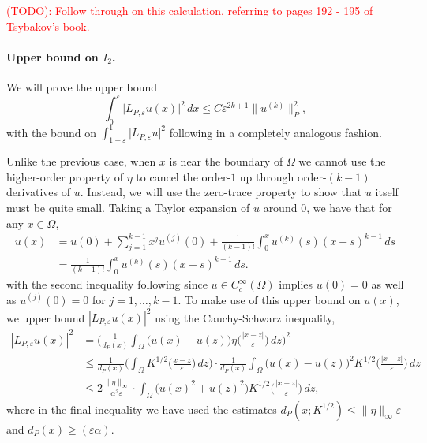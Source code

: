 \documentclass{article}
\newcommand{\1}{\mathbf{1}}
\theoremstyle{definition}
\theoremstyle{remark}
\begin{document}
\textcolor{red}{(TODO): Follow through on this calculation, referring to pages 192 - 195 of Tsybakov's book.}

\paragraph{Upper bound on $I_2$.}
We will prove the upper bound
\begin{equation}
\label{pf:kernel_smoothing_bias_1d_2}
\int_{0}^{\varepsilon} \bigl|L_{P,\varepsilon}u(x)\bigr|^2 \,dx \leq C \varepsilon^{2k + 1}\|u^{(k)}\|_P^2,
\end{equation}
with the bound on $\int_{1 - \varepsilon}^{1} \bigl|L_{P,\varepsilon}u\bigr|^2$ following in a completely analogous fashion.

Unlike the previous case, when $x$ is near the boundary of $\Omega$ we cannot use the higher-order property of $\eta$ to cancel the order-$1$ up through order-$(k - 1)$ derivatives of $u$. Instead, we will use the zero-trace property to show that $u$ itself must be quite small. Taking a Taylor expansion of $u$ around $0$, we have that for any $x \in \Omega$,
\begin{align}
u(x) & = u(0) + \sum_{j = 1}^{k - 1} x^j u^{(j)}(0) + \frac{1}{(k - 1)!} \int_{0}^{x}u^{(k)}(s)(x - s)^{k - 1}\,ds \nonumber \\
& = \frac{1}{(k - 1)!} \int_{0}^{x}u^{(k)}(s)(x - s)^{k - 1}\,ds. \label{pf:kernel_smoothing_bias_1d_3}
\end{align}
with the second inequality following since $u \in C_c^{\infty}(\Omega)$ implies $u(0) = 0$ as well as $u^{(j)}(0) = 0$ for $j = 1,\ldots,k - 1$. To make use of this upper bound on $u(x)$, we upper bound $|L_{P,\varepsilon}u(x)|^2$ using the Cauchy-Schwarz inequality,
\begin{align*}
|L_{P,\varepsilon}u(x)|^2 & = \Biggl(\frac{1}{d_P(x)} \int_{\Omega} \bigl(u(x) - u(z)\bigr) \eta\biggl(\frac{|x - z|}{\varepsilon}\biggr) \,dz\Biggr)^2 \\
& \leq \frac{1}{d_P(x)}\biggl(\int_{\Omega} K^{1/2}\biggl(\frac{x - z}{\varepsilon}\biggr) \,dz\biggr) \cdot \frac{1}{d_P(x)}\int_{\Omega} \bigl(u(x) - u(z)\bigr)^2 K^{1/2}\biggl(\frac{|x - z|}{\varepsilon}\biggr) \,dz \\
& \leq 2\frac{\|\eta\|_{\infty}}{\alpha^2\varepsilon} \cdot \int_{\Omega} \bigl(u(x)^2 + u(z)^2\bigr) K^{1/2}\biggl(\frac{|x - z|}{\varepsilon}\biggr) \,dz,
\end{align*}
where in the final inequality we have used the estimates $d_P(x;K^{1/2}) \leq \|\eta\|_{\infty} \varepsilon$ and $d_P(x) \geq (\varepsilon\alpha)$. 
\end{document}
